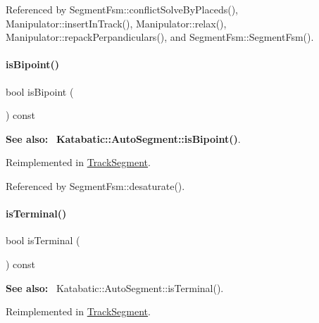 Referenced by Segment\+Fsm\+::conflict\+Solve\+By\+Placeds(), Manipulator\+::insert\+In\+Track(), Manipulator\+::relax(), Manipulator\+::repack\+Perpandiculars(), and Segment\+Fsm\+::\+Segment\+Fsm().

\mbox{\label{classKite_1_1TrackElement_a72741158d19af38e84c5e9c08f91270f}} 
\paragraph{\texorpdfstring{is\+Bipoint()}{isBipoint()}}
{\footnotesize\ttfamily bool is\+Bipoint (\begin{DoxyParamCaption}{ }\end{DoxyParamCaption}) const\hspace{0.3cm}{\ttfamily [virtual]}}

{\bfseries See also\+:}~ \textbf{ Katabatic\+::\+Auto\+Segment\+::is\+Bipoint()}. 

Reimplemented in \mbox{\hyperlink{classKite_1_1TrackSegment_a72741158d19af38e84c5e9c08f91270f}{Track\+Segment}}.



Referenced by Segment\+Fsm\+::desaturate().

\mbox{\label{classKite_1_1TrackElement_a1e074cb3064037035548e5e6d238e315}} 
\paragraph{\texorpdfstring{is\+Terminal()}{isTerminal()}}
{\footnotesize\ttfamily bool is\+Terminal (\begin{DoxyParamCaption}{ }\end{DoxyParamCaption}) const\hspace{0.3cm}{\ttfamily [virtual]}}

{\bfseries See also\+:}~ Katabatic\+::\+Auto\+Segment\+::is\+Terminal(). 

Reimplemented in \mbox{\hyperlink{classKite_1_1TrackSegment_a1e074cb3064037035548e5e6d238e315}{Track\+Segment}}.




